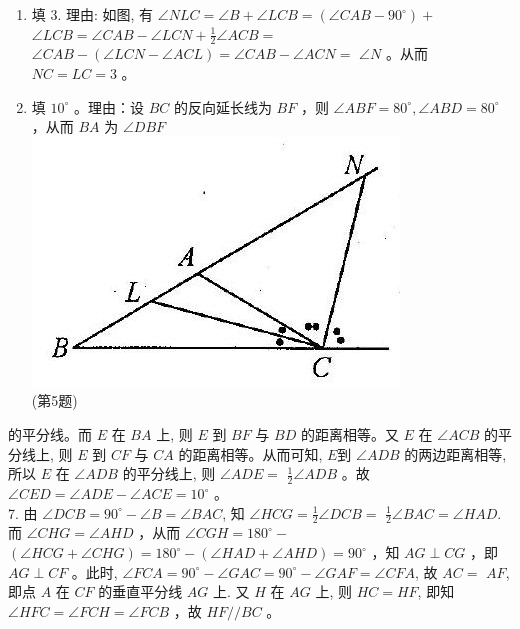 \documentclass[10pt]{article}
\begin{document}
\begin{enumerate}
  \item 填 3. 理由: 如图, 有 $\angle N L C=\angle B+\angle L C B=\left(\angle C A B-90^{\circ}\right)+$\\
$\angle L C B=\angle C A B-\angle L C N+\frac{1}{2} \angle A C B=$ $\angle C A B-(\angle L C N-\angle A C L)=\angle C A B-\angle A C N=$ $\angle N$ 。从而 $N C=L C=3$ 。
  \item 填 $10^{\circ}$ 。理由：设 $B C$ 的反向延长线为 $B F$ ，则 $\angle A B F=80^{\circ}, \angle A B D=80^{\circ}$ ，从而 $B A$ 为 $\angle D B F$\\
\includegraphics[max width=\textwidth, center]{2024_10_30_2c8f45efd4a519b08e1ag-156}\\
(第5题)
\end{enumerate}

的平分线。而 $E$ 在 $B A$ 上, 则 $E$ 到 $B F$ 与 $B D$ 的距离相等。又 $E$ 在 $\angle A C B$ 的平分线上, 则 $E$ 到 $C F$ 与 $C A$ 的距离相等。从而可知, $E$到 $\angle A D B$ 的两边距离相等, 所以 $E$ 在 $\angle A D B$ 的平分线上, 则 $\angle A D E=$ $\frac{1}{2} \angle A D B$ 。故 $\angle C E D=\angle A D E-\angle A C E=10^{\circ}$ 。\\
7. 由 $\angle D C B=90^{\circ}-\angle B=\angle B A C$, 知 $\angle H C G=\frac{1}{2} \angle D C B=$ $\frac{1}{2} \angle B A C=\angle H A D$. 而 $\angle C H G=\angle A H D$ ，从而 $\angle C G H=180^{\circ}-$ $(\angle H C G+\angle C H G)=180^{\circ}-(\angle H A D+\angle A H D)=90^{\circ}$ ，知 $A G \perp C G$ ，即 $A G \perp C F$ 。此时, $\angle F C A=90^{\circ}-\angle G A C=90^{\circ}-\angle G A F=\angle C F A$, 故 $A C=$ $A F$, 即点 $A$ 在 $C F$ 的垂直平分线 $A G$ 上. 又 $H$ 在 $A G$ 上, 则 $H C=H F$, 即知 $\angle H F C=\angle F C H=\angle F C B$ ，故 $H F / / B C$ 。
\end{document}
